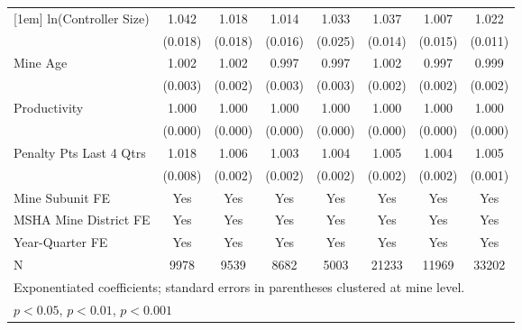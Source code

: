 {\begin{tabular}{l*{7}{c}}
[1em]
ln(Controller Size)      &       1.042\sym{*}  &       1.018         &       1.014         &       1.033         &       1.037\sym{**} &       1.007         &       1.022\sym{*}  \\
                         &     (0.018)         &     (0.018)         &     (0.016)         &     (0.025)         &     (0.014)         &     (0.015)         &     (0.011)         \\
[1em]
Mine Age                 &       1.002         &       1.002         &       0.997         &       0.997         &       1.002         &       0.997         &       0.999         \\
                         &     (0.003)         &     (0.002)         &     (0.003)         &     (0.003)         &     (0.002)         &     (0.002)         &     (0.002)         \\
[1em]
Productivity             &       1.000         &       1.000         &       1.000         &       1.000         &       1.000         &       1.000         &       1.000         \\
                         &     (0.000)         &     (0.000)         &     (0.000)         &     (0.000)         &     (0.000)         &     (0.000)         &     (0.000)         \\
[1em]
Penalty Pts Last 4 Qtrs  &       1.018\sym{*}  &       1.006\sym{***}&       1.003         &       1.004         &       1.005\sym{***}&       1.004\sym{*}  &       1.005\sym{***}\\
                         &     (0.008)         &     (0.002)         &     (0.002)         &     (0.002)         &     (0.002)         &     (0.002)         &     (0.001)         \\
[1em]
Mine Subunit FE          &         Yes         &         Yes         &         Yes         &         Yes         &         Yes         &         Yes         &         Yes         \\
[1em]
MSHA Mine District FE    &         Yes         &         Yes         &         Yes         &         Yes         &         Yes         &         Yes         &         Yes         \\
[1em]
Year-Quarter FE          &         Yes         &         Yes         &         Yes         &         Yes         &         Yes         &         Yes         &         Yes         \\
\hline
N                        &        9978         &        9539         &        8682         &        5003         &       21233         &       11969         &       33202         \\
\hline\hline
\multicolumn{8}{l}{\footnotesize Exponentiated coefficients; standard errors in parentheses clustered at mine level.}\\
\multicolumn{8}{l}{\footnotesize \sym{*} \(p<0.05\), \sym{**} \(p<0.01\), \sym{***} \(p<0.001\)}\\
\end{tabular}
}

